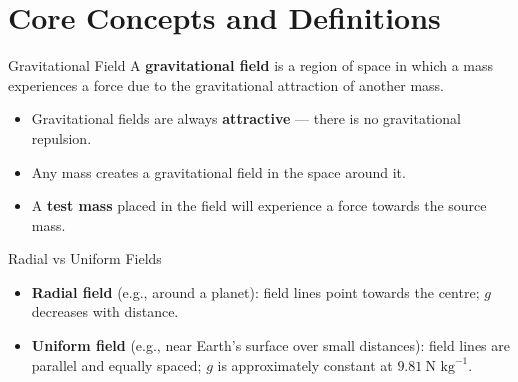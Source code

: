 \documentclass[12pt,a4paper]{article}
\begin{document}

\tableofcontents
\newpage

\section{Core Concepts and Definitions}

\begin{definitionbox}{Gravitational Field}
A \textbf{gravitational field} is a region of space in which a mass experiences a force due to the gravitational attraction of another mass.
\begin{itemize}[itemsep=2pt]
  \item Gravitational fields are always \textbf{attractive} — there is no gravitational repulsion.
  \item Any mass creates a gravitational field in the space around it.
  \item A \textbf{test mass} placed in the field will experience a force towards the source mass.
\end{itemize}
\end{definitionbox}

\begin{definitionbox}{Radial vs Uniform Fields}
\begin{itemize}[itemsep=2pt]
  \item \textbf{Radial field} (e.g., around a planet): field lines point towards the centre; $g$ decreases with distance.
  \item \textbf{Uniform field} (e.g., near Earth's surface over small distances): field lines are parallel and equally spaced; $g$ is approximately constant at $9.81\ \text{N kg}^{-1}$.
\end{itemize}
\end{definitionbox}
\end{document}
